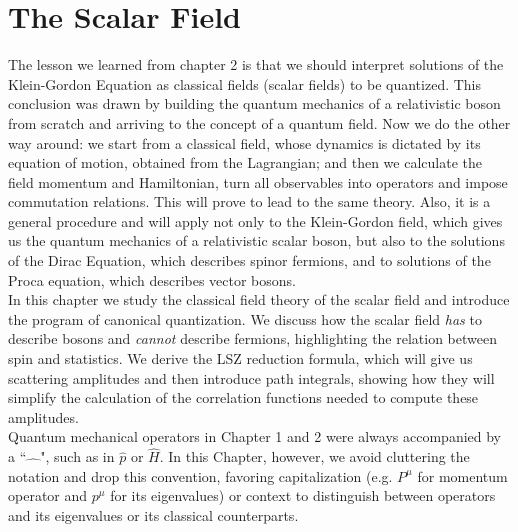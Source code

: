 \chapter{The Scalar Field}
    The lesson we learned from chapter 2 is that we should interpret solutions of the Klein-Gordon Equation as classical fields (scalar fields) to be quantized. This conclusion was drawn by building the quantum mechanics of a relativistic boson from scratch and arriving to the concept of a quantum field. Now we do the other way around: we start from a classical field, whose dynamics is dictated by its equation of motion, obtained from the Lagrangian; and then we calculate the field momentum and Hamiltonian, turn all observables into operators and impose commutation relations. This will prove to lead to the same theory. Also, it is a general procedure and will apply not only to the Klein-Gordon field, which gives us the quantum mechanics of a relativistic scalar boson, but also to the solutions of the Dirac Equation, which describes spinor fermions, and to solutions of the Proca equation, which describes vector bosons.\\

 In this chapter we study the classical field theory of the scalar field and introduce the program of canonical quantization. We discuss how the scalar field \textit{has} to describe bosons and \textit{cannot} describe fermions, highlighting the relation between spin and statistics. We derive the LSZ reduction formula, which will give us scattering amplitudes and then introduce path integrals, showing how they will simplify the calculation of the correlation functions needed to compute these amplitudes.\\
 
 Quantum mechanical operators in Chapter 1 and 2 were always accompanied by a ``$\hat{\quad}$", such as  in $\hat{p}$ or $\hat{H}$. In this Chapter, however, we avoid cluttering the notation and drop this convention, favoring capitalization (e.g. $P^\mu$ for momentum operator and $p^\mu$ for its eigenvalues) or context to distinguish between operators and its eigenvalues or its classical counterparts. 
